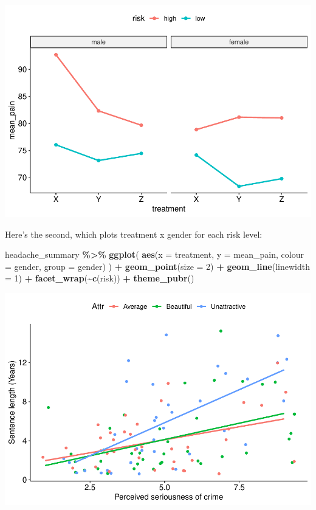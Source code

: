\documentclass[
]{book}
\newenvironment{Shaded}{\begin{snugshade}}{\end{snugshade}}
\newcommand{\AttributeTok}[1]{\textcolor[rgb]{0.13,0.29,0.53}{#1}}
\newcommand{\DecValTok}[1]{\textcolor[rgb]{0.00,0.00,0.81}{#1}}
\newcommand{\FunctionTok}[1]{\textcolor[rgb]{0.13,0.29,0.53}{\textbf{#1}}}
\newcommand{\NormalTok}[1]{#1}
\newcommand{\SpecialCharTok}[1]{\textcolor[rgb]{0.81,0.36,0.00}{\textbf{#1}}}
\begin{document}
\includegraphics{_main_files/figure-latex/unnamed-chunk-267-1.pdf}

Here's the second, which plots treatment x gender for each risk level:

\begin{Shaded}
\begin{Highlighting}[]
\NormalTok{headache\_summary }\SpecialCharTok{\%\textgreater{}\%}
  \FunctionTok{ggplot}\NormalTok{(}
    \FunctionTok{aes}\NormalTok{(}\AttributeTok{x =}\NormalTok{ treatment, }\AttributeTok{y =}\NormalTok{ mean\_pain, }\AttributeTok{colour =}\NormalTok{ gender, }\AttributeTok{group =}\NormalTok{ gender)}
\NormalTok{  ) }\SpecialCharTok{+}
  \FunctionTok{geom\_point}\NormalTok{(}\AttributeTok{size =} \DecValTok{2}\NormalTok{) }\SpecialCharTok{+}
  \FunctionTok{geom\_line}\NormalTok{(}\AttributeTok{linewidth =} \DecValTok{1}\NormalTok{) }\SpecialCharTok{+}
  \FunctionTok{facet\_wrap}\NormalTok{(}\SpecialCharTok{\textasciitilde{}}\FunctionTok{c}\NormalTok{(risk)) }\SpecialCharTok{+}
  \FunctionTok{theme\_pubr}\NormalTok{()}
\end{Highlighting}
\end{Shaded}

\includegraphics{_main_files/figure-latex/unnamed-chunk-268-1.pdf}
\end{document}
